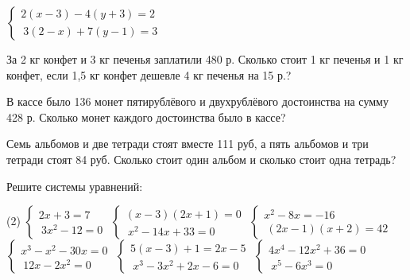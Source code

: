 \begin{class}[number=5]
\begin{listofex}
\begin{tasks}
			\task \( \begin{cases}
				2(x-3)-4(y+3)=2\\\ 3(2-x)+7(y-1)=3
			\end{cases} \)
		\end{tasks}
		\item  За 2 кг конфет и 3 кг печенья заплатили 480 р. Сколько стоит 1 кг печенья  и 1 кг конфет, если 1,5 кг конфет дешевле 4 кг печенья на 15 р.?
		\item  В кассе было 136 монет пятирублёвого и  двухрублёвого достоинства на сумму 428 р. Сколько монет каждого достоинства было в кассе?
		\item Семь альбомов и две тетради стоят вместе 111 руб, а пять альбомов и три тетради стоят 84 руб. Сколько стоит один альбом и сколько стоит одна тетрадь?
	\end{listofex}
\end{class}

\begin{class}[number=6]
	\begin{listofex}
		\item  Решите системы уравнений:
		\begin{tasks}(2)
			\task \( \begin{cases}
				2x+3=7 \\\ 3x^{2}-12=0
			\end{cases} \)
			\task \( \begin{cases}
				(x-3)(2x+1)=0 \\\ x^{2}-14x+33=0
			\end{cases} \)
			\task \( \begin{cases}
				x^{2}-8x=-16 \\\ (2x-1)(x+2)=42
			\end{cases} \)
			\task \( \begin{cases}
				x^{3}-x^{2}-30x=0\\\ 12x-2x^{2}=0
			\end{cases} \)
			\task \( \begin{cases}
				5(x-3)+1=2x-5\\\ x^{3}-3x^{2}+2x -6=0
			\end{cases} \)
			\task \( \begin{cases}
				4x^{4}-12x^{2}+36=0\\\ x^{5}-6x^{3}=0
			\end{cases} \)
		\end{tasks}
	\end{listofex}
\end{class}

